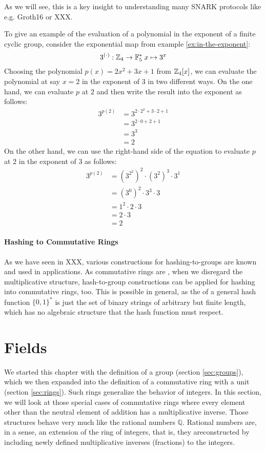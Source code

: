 As we will see, this is a key insight to understanding many SNARK protocols like e.g. Groth16 \citep{Groth16} or XXX.
\begin{example} To give an example of the evaluation of a polynomial in the exponent of a finite cyclic group, consider the exponential map from example \ref{ex:in-the-exponent}:
$$
3^{(\cdot)}: \mathbb{Z}_4 \to \mathbb{F}_5^* \; x \mapsto 3^x
$$
 Choosing the polynomial $p(x)= 2x^2 +3x +1$ from $\mathbb{Z}_4[x]$, we can evaluate the polynomial at say $x=2$ in the exponent of $3$ in two different ways. On the one hand, we can evaluate $p$ at $2$ and then write the result into the exponent as follows:
\begin{align*}
3^{p(2)} &=3^{2\cdot 2^2+3\cdot 2 +1}\\
          & = 3^{2\cdot 0 +2 +1}\\
          & = 3^{3}\\
          & = 2
\end{align*}
On the other hand, we can use the right-hand side of the equation to evaluate $p$ at $2$ in the exponent of $3$ as follows:
\begin{align*}
3^{p(2)} &= \left(3^{2^2}\right)^2 \cdot \left(3^{2}\right)^3\cdot 3^1\\
         &= \left(3^{0}\right)^2 \cdot 3^3\cdot 3\\
         &= 1^2 \cdot 2 \cdot 3\\
         &= 2 \cdot 3\\
         &= 2
\end{align*}
\end{example}
\paragraph{Hashing to Commutative Rings} As we have seen in XXX, various constructions for hashing-to-groups are known and used in applications. As commutative rings are , when we disregard the multiplicative structure, hash-to-group constructions can be applied for hashing into commutative rings, too. This is possible in general, as the  of a general hash function $\{0,1\}^*$ is just the set of binary strings of arbitrary but finite length, which has no algebraic structure that the hash function must respect.

\section{Fields}\label{sec:fields}
We started this chapter with the definition of a group (section \ref{sec:groups}), which we then expanded into the definition of a commutative ring with a unit (section \ref{sec:rings}). Such rings generalize the behavior of integers. In this section, we will look at those special cases of commutative rings where every element other than the neutral element of addition has a multiplicative inverse. Those structures behave very much like the rational numbers $\mathbb{Q}$. Rational numbers are, in a sense, an extension of the ring of integers, that is, they areconstructed by including newly defined multiplicative inverses (fractions) to the integers.

